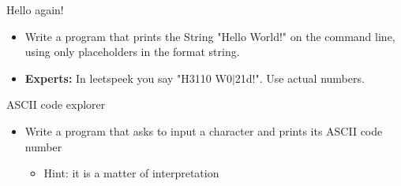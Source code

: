 \begin{frame}[fragile]{Hello again!}
	\begin{itemize}
	
		\item Write a program that prints the String "Hello World!" on the command line, using only placeholders in the format string.
		\item \textbf{Experts:} In leetspeek you say "H3110 W0$|$21d!". Use actual numbers.

	\end{itemize}
\end{frame}
\begin{frame}[fragile]{ASCII code explorer}
	\begin{itemize}
		\item Write a program that asks to input a character and prints its ASCII code number
		\begin{itemize}
			\item<2-> Hint: it is a matter of interpretation
		\end{itemize}

	\end{itemize}	
\end{frame}

